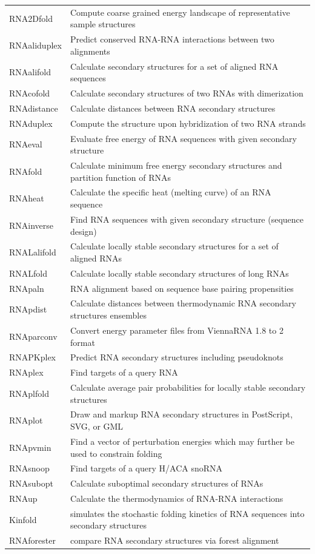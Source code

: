 \documentclass[a4paper]{article}
\begin{document}
  {\small
  \begin{tabular}{ll}
	RNA2Dfold & Compute coarse grained energy landscape of representative sample structures\\
	RNAaliduplex & Predict conserved RNA-RNA interactions between two alignments\\
	RNAalifold & Calculate secondary structures for a set of aligned RNA sequences\\
	RNAcofold & Calculate secondary structures of two RNAs with dimerization\\
	RNAdistance & Calculate distances between RNA secondary structures\\
	RNAduplex & Compute the structure upon hybridization of two RNA strands\\
	RNAeval & Evaluate free energy of RNA sequences with given secondary structure\\
	RNAfold & Calculate minimum free energy secondary structures and partition function of RNAs\\
	RNAheat & Calculate the specific heat (melting curve) of an RNA sequence\\
	RNAinverse & Find RNA sequences with given secondary structure (sequence design)\\
	RNALalifold & Calculate locally stable secondary structures for a set of aligned RNAs\\
	RNALfold & Calculate locally stable secondary structures of long RNAs\\
	RNApaln & RNA alignment based on sequence base pairing propensities\\
	RNApdist & Calculate distances between thermodynamic RNA secondary structures ensembles\\
	RNAparconv & Convert energy parameter files from ViennaRNA 1.8 to 2 format\\
	RNAPKplex & Predict RNA secondary structures including pseudoknots\\
	RNAplex & Find targets of a query RNA\\
	RNAplfold & Calculate average pair probabilities for locally stable secondary structures\\
	RNAplot & Draw and markup RNA secondary structures in PostScript, SVG, or GML\\
	RNApvmin & Find a vector of perturbation energies which may further be used to constrain folding\\
	RNAsnoop & Find targets of a query H/ACA snoRNA\\
	RNAsubopt & Calculate suboptimal secondary structures of RNAs\\
	RNAup & Calculate the thermodynamics of RNA-RNA interactions\\
	Kinfold & simulates  the stochastic folding kinetics of RNA sequences into secondary structures\\
	RNAforester \footnotemark & compare RNA secondary structures via forest alignment\\
  \end{tabular}}
\end{document}
